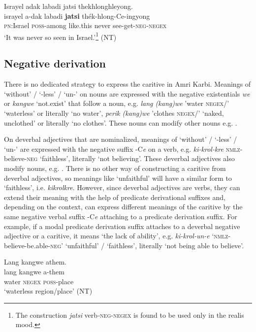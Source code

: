 \documentclass[output=paper,colorlinks,citecolor=brown]{langscibook}
\begin{document}
\ea\label{ex:amr:47} Israyel adak labadi jatsi thekhlonghleyong. \\
    \gll  israyel a-dak labadi \textbf{jatsi} th\'{e}k-hlong-Ce-ingyong\\
         \textsc{pn}:Israel \textsc{poss}{}-among like.this never see-get-\textsc{neg}{}-\textsc{negex}\\
    \glt ‘It was never so seen in Israel.’\footnote{The construction \textit{jatsi} verb\textit{{}-}\textsc{neg-negex} is found to be used only in the realis mood.} (NT)
\z

\subsection{Negative derivation}\label{sec:amr:3.3}
There is no dedicated strategy to express the caritive in Amri Karbi. Meanings of ‘without’ / ‘-less’ / ‘un-’ on nouns are expressed with the negative existentials \textit{we} or \textit{kangwe} ‘not.exist’ that follow a noun, e.g. \textit{lang (kang)we} 'water \textsc{negex/}' ‘waterless’ or literally ‘no water’, \textit{perik (kang)we} 'clothes \textsc{negex/}' ‘naked, unclothed’ or literally ‘no clothes’. These nouns can modify other nouns e.g. .

On deverbal adjectives that are nominalized, meanings of ‘without’ / ‘-less’ / ‘un-’ are expressed with the negative suffix -C\textit{e} on a verb, e.g. \textit{ki-krol-kre} \textsc{nmlz}{}-believe-\textsc{neg} ‘faithless’, literally ‘not believing’. These deverbal adjectives also modify nouns, e.g. . There is no other way of constructing a caritive from deverbal adjectives, so meanings like ‘unfaithful’ will have a similar form to ‘faithless’, i.e. \textit{kikrolkre}. However, since deverbal adjectives are verbs, they can extend their meaning with the help of predicate derivational suffixes and, depending on the context, can express different meanings of the caritive by the same negative verbal suffix -C\textit{e} attaching to a predicate derivation suffix. For example, if a modal predicate derivation suffix attaches to a deverbal negative adjective or a caritive, it means ‘the lack of ability’, e.g. \textit{ki-krol-un-e} ‘\textsc{nmlz}{}-believe-be.able-\textsc{neg’} ‘unfaithful’ / ‘faithless’, literally ‘not being able to believe’. 

\ea\label{ex:amr:48} Lang kangwe athem.\\
    \gll lang kangwe a-them\\
          water \textsc{negex} \textsc{poss}{}-place\\
    \glt ‘waterless region/place’ (NT)
\z
\end{document}
